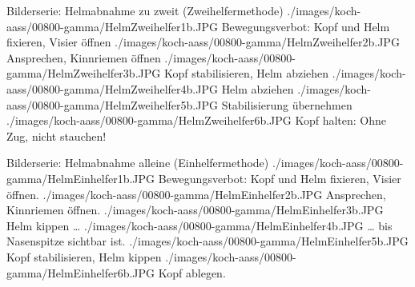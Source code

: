 \begin{PictureSeriesWide}{}{Bilderserie: Helmabnahme zu zweit
(Zweihelfermethode)}
{./images/koch-aass/00800-gamma/HelmZweihelfer1b.JPG}
{Bewegungsverbot:  
Kopf und Helm fixieren, Visier öffnen
 }
{./images/koch-aass/00800-gamma/HelmZweihelfer2b.JPG}
{Ansprechen, Kinnriemen öffnen}
{./images/koch-aass/00800-gamma/HelmZweihelfer3b.JPG}
{Kopf stabilisieren, Helm abziehen}
{}
{}
{./images/koch-aass/00800-gamma/HelmZweihelfer4b.JPG}
{Helm abziehen }
{./images/koch-aass/00800-gamma/HelmZweihelfer5b.JPG}
{Stabilisierung übernehmen}
{./images/koch-aass/00800-gamma/HelmZweihelfer6b.JPG}
{Kopf halten: Ohne Zug, nicht stauchen! 
}
{}
{}
\end{PictureSeriesWide}


\begin{PictureSeriesWide}{}{Bilderserie: Helmabnahme alleine
(Einhelfermethode)}
{./images/koch-aass/00800-gamma/HelmEinhelfer1b.JPG}
{Bewegungsverbot: 
Kopf und Helm fixieren, Visier öffnen.}
{./images/koch-aass/00800-gamma/HelmEinhelfer2b.JPG}
{Ansprechen, Kinnriemen öffnen. }
{./images/koch-aass/00800-gamma/HelmEinhelfer3b.JPG}
{Helm kippen \ldots}
{}
{}
{./images/koch-aass/00800-gamma/HelmEinhelfer4b.JPG}
{{\ldots} bis
Nasenspitze sichtbar ist.}
{./images/koch-aass/00800-gamma/HelmEinhelfer5b.JPG}
{Kopf stabilisieren, Helm kippen}
{./images/koch-aass/00800-gamma/HelmEinhelfer6b.JPG}
{Kopf ablegen.
}
{}
{}
\end{PictureSeriesWide}






